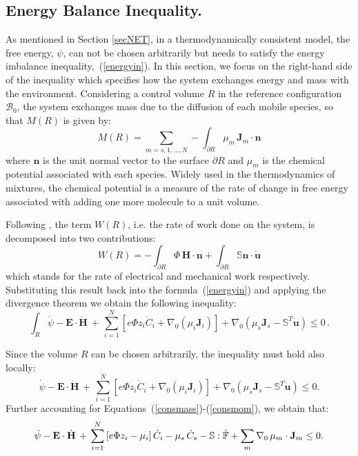 \subsection{Energy Balance Inequality.}
\label{sec_ine}

As mentioned in Section \ref{secNET}, in a thermodynamically consistent model, the free energy, $\psi$, can not be chosen arbitrarily but needs to satisfy the energy imbalance inequality,~(\ref{energyin}). In this section, we focus on the right-hand side of the inequality which specifies how the system exchanges energy and mass with the environment. Considering a control volume $R$ in the reference configuration $\mathcal{B}_0$, the system exchanges mass due to the diffusion of each mobile species, so that $M(R)$ is given by:
\begin{equation}
M(R)= \sum\limits_{m=s,1,\ldots,N} - \int_{\partial R} \mu_m \,\mathbf{J}_m \cdot \mathbf{n} \label{M}
\end{equation}
where $\mathbf{n}$ is the unit normal vector to the surface $\partial R$ and $\mu_m$ is the chemical potential associated with each species. Widely used in the thermodynamics of mixtures, the chemical potential is a measure of the rate of change in free energy associated with adding one more molecule to a unit volume.

Following \cite{DROZDOVph}, the term $W(R)$, i.e. the rate of work done on the system, is decomposed into two contributions:
\begin{equation}
W(R) = -\int_{\partial R} \Phi\, \dot{\mathbf{H}}\cdot \mathbf{n} +  \int_{\partial R}\mathbb{S}\mathbf{n} \cdot \dot{\mathbf{u}}\label{W}
\end{equation}
which stands for the rate of electrical and mechanical work respectively. Substituting this result back into the formula~(\ref{energyin}) and applying the divergence theorem we obtain the following inequality:
\begin{equation}
\int_R \dot{\psi} - \mathbf{E}\cdot \dot{\mathbf{H}} \, + \, \sum\limits_{i=1}^{N} \left[e \Phi  z_i \dot{C}_i+ \nabla_0 \left(\mu_i \mathbf{J}_i \right)\right] + \nabla_0 (\mu_s \mathbf{J}_s-\mathbb{S}^T\mathbf{\dot{u}}) \leq 0\,. 
\end{equation}

Since the volume $R$ can be chosen arbitrarily, the inequality must hold also locally:
\begin{equation}
\dot{\psi} - \mathbf{E}\cdot \dot{\mathbf{H}} \, + \, \sum\limits_{i=1}^{N} \left[e \Phi  z_i \dot{C}_i+ \nabla_0 \left(\mu_i \mathbf{J}_i \right)\right] + \nabla_0 (\mu_s \mathbf{J}_s -\mathbb{S}^T\mathbf{\dot{u}}) \leq 0. 
\end{equation}
Further accounting for Equations~(\ref{consmass})-(\ref{consmom}), we obtain that:
\begin{equation}
\begin{aligned}
\dot{\psi} - \mathbf{E}\cdot \dot{\mathbf{H}} \, + \, \sum\limits_{i=1}^{N} \left[e \Phi  z_i - \mu_i\right] \dot{C}_i - \mu_s \,\dot{C}_s -\mathbb{S}:\dot{\mathbb{F}}+ \sum\limits_{m} \nabla_0 \, \mu_m \cdot \mathbf{J}_m \leq 0.
\end{aligned}
\label{temp2} 
\end{equation}

